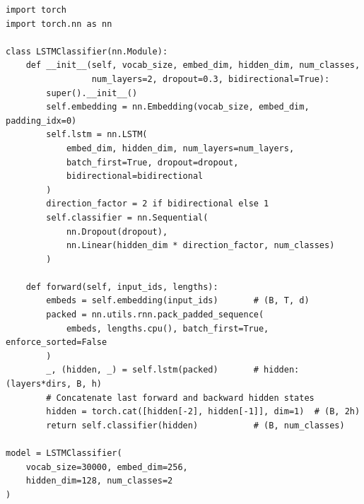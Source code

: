 \begin{codeblock}[title=\textbf{LSTM for text classification}]
\begin{verbatim}
import torch
import torch.nn as nn

class LSTMClassifier(nn.Module):
    def __init__(self, vocab_size, embed_dim, hidden_dim, num_classes,
                 num_layers=2, dropout=0.3, bidirectional=True):
        super().__init__()
        self.embedding = nn.Embedding(vocab_size, embed_dim, padding_idx=0)
        self.lstm = nn.LSTM(
            embed_dim, hidden_dim, num_layers=num_layers,
            batch_first=True, dropout=dropout,
            bidirectional=bidirectional
        )
        direction_factor = 2 if bidirectional else 1
        self.classifier = nn.Sequential(
            nn.Dropout(dropout),
            nn.Linear(hidden_dim * direction_factor, num_classes)
        )

    def forward(self, input_ids, lengths):
        embeds = self.embedding(input_ids)       # (B, T, d)
        packed = nn.utils.rnn.pack_padded_sequence(
            embeds, lengths.cpu(), batch_first=True, enforce_sorted=False
        )
        _, (hidden, _) = self.lstm(packed)       # hidden: (layers*dirs, B, h)
        # Concatenate last forward and backward hidden states
        hidden = torch.cat([hidden[-2], hidden[-1]], dim=1)  # (B, 2h)
        return self.classifier(hidden)           # (B, num_classes)

model = LSTMClassifier(
    vocab_size=30000, embed_dim=256,
    hidden_dim=128, num_classes=2
)
\end{verbatim}
\end{codeblock}

